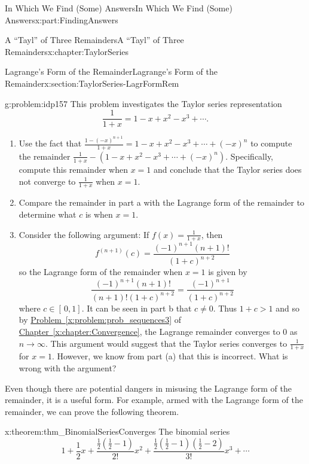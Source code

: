 \documentclass[oneside,10pt,]{book}
\newcommand{\xreffont}{\relax}
\numberwithin{equation}{section}
\begin{document}
\begin{partptx}{In Which We Find (Some) Answers}{}{In Which We Find (Some) Answers}{}{}{x:part:FindingAnswers}
\begin{chapterptx}{A ``Tayl'' of Three Remainders}{}{A ``Tayl'' of Three Remainders}{}{}{x:chapter:TaylorSeries}
\begin{sectionptx}{Lagrange's Form of the Remainder}{}{Lagrange's Form of the Remainder}{}{}{x:section:TaylorSeries-LagrFormRem}
\begin{problem}{}{g:problem:idp157}%
This problem investigates the Taylor series representation%
\begin{equation*}
\frac{1}{1+x}=1-x+x^2-x^3+\cdots\text{.}
\end{equation*}
%
\begin{enumerate}[font=\bfseries,label=(\alph*),ref=\alph*]
\item{}Use the fact that \(\frac{1-(-x)^{n+1}}{1+x}=1-x+x^2-x^3+\cdots+(-x)^n\) to compute the remainder \(\frac{1}{1+x}-\left(1-x+x^2-x^3+\cdots+(-x)^n\right)\). Specifically, compute this remainder when \(x=1\) and conclude that the Taylor series does not converge to \(\frac{1}{1+x}\) when \(x=1\).%
\item{}Compare the remainder in part a with the Lagrange form of the remainder to determine what \(c\) is when \(x=1\).%
\item{}Consider the following argument: If \(f(x)=\frac{1}{1+x}\), then%
\begin{equation*}
f^{(n+1)}(c)=\frac{(-1)^{n+1}(n+1)!}{(1+c)^{n+2}}
\end{equation*}
so the Lagrange form of the remainder when \(x=1\) is given by%
\begin{equation*}
\frac{(-1)^{n+1}(n+1)!}{(n+1)!(1+c)^{n+2}}=\frac{(-1)^{n+1}}{(1+c)^{n+2}}
\end{equation*}
where \(c\in[\,0,1]\).  It can be seen in part b that \(c\neq 0\).  Thus \(1+c>1\) and so by \hyperref[x:problem:prob_sequences3]{Problem~{\xreffont\ref{x:problem:prob_sequences3}}} of \hyperref[x:chapter:Convergence]{Chapter~{\xreffont\ref{x:chapter:Convergence}}}, the Lagrange remainder converges to \(0\) as \(n\rightarrow\infty\).  This argument would suggest that the Taylor series converges to \(\frac{1}{1+x}\) for \(x=1\).  However, we know from part (a) that this is incorrect.  What is wrong with the argument?%
\end{enumerate}
\end{problem}
Even though there are potential dangers in misusing the Lagrange form of the remainder, it is a useful form.  For example, armed with the Lagrange form of the remainder, we can prove the following theorem.%
\begin{theorem}{}{}{x:theorem:thm_BinomialSeriesConverges}%
%
%
The binomial series%
\begin{equation*}
1+\frac{1}{2}x+\frac{\frac{1}{2}\left(\frac{1}{2}-1\right)}{2!}x^2+\frac{\frac{1}{2}\left(\frac{1}{2}-1\right)\left(\frac{1}{2}-2\right)}{3!}x^3+\cdots

\end{equation*}
\end{theorem}
\end{sectionptx}
\end{chapterptx}
\end{partptx}
\end{document}
